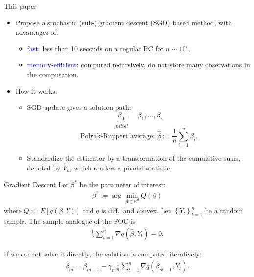 \documentclass[beamer, t]{beamer}
\newcommand{\eqs}[1]{\begin{align*}#1\end{align*}}
\begin{document}
\begin{frame}{This paper}
	
	\begin{itemize}
		\item Propose a stochastic (sub-) gradient descent (SGD) based method, with advantages of:
		
		\begin{itemize}
			\item \textcolor{blue}{fast}:   less than 10 seconds on a regular PC for $n\sim 10^7$. 
			
			\item       \textcolor{blue}{memory-efficient}:  computed recursively, do not store many observations in the computation.
		\end{itemize}
		
		
		\item How it works:
		
		\begin{itemize}
			\item SGD update gives a solution path:
			$$
			\underbrace{\beta_0}_{initial},\quad \beta_1,...,\beta_n
			$$
			$$
			\text{Polyak-Ruppert average: } \widehat\beta:= \frac{1}{n}\sum_{i=1}^n\beta_i.
			$$
			\item Standardize the estimator by a transformation of the cumulative sums, denoted by $\widehat V_n$, which renders a pivotal statistic.
		\end{itemize}
		
		
		
	\end{itemize}
\end{frame}



\begin{frame}{Gradient Descent}
Let $\beta^*$ be the parameter of interest:
\eqs{
    \beta^{*}:=\arg\min_{\beta\in\mathbb{R}^{d}}Q\left(\beta\right)
}
where $Q:=E[q(\beta,Y)]$ and $q$ is diff.~and convex. Let $\left\{ Y_{t}\right\} _{t=1}^{n}$ be a random sample. The sample analogue of the FOC is
\eqs{
    \frac{1}{n}\sum_{t=1}^n \nabla q\left(\hat{\beta},Y_{t}\right) = 0.
}

If we cannot solve it directly, the solution is computed iteratively:
\eqs{
    \hat{\beta}_{m} = \hat{\beta}_{m-1} - \gamma_m \frac{1}{n}\sum_{t=1}^n \nabla q\left(\hat{\beta}_{m-1},Y_{t}\right).
}
\end{frame}
\end{document}
